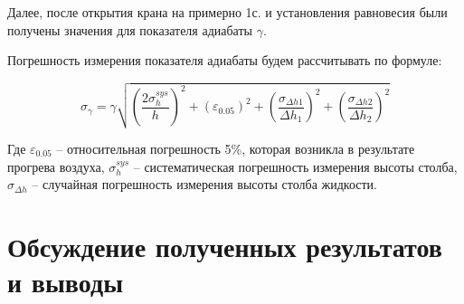 \documentclass[a4paper,12pt]{article}
\begin{document}
    Далее, после открытия крана на примерно 1с. и установления равновесия были получены значения для показателя адиабаты $\gamma$.

    \begin{figure}
        
        
    \end{figure}

    Погрешность измерения показателя адиабаты будем рассчитывать по формуле:

    \begin{equation}
        \sigma_\gamma=\gamma\sqrt{\left(
            \frac{2\sigma_h^{sys}}{h}\right)^2+\left(\varepsilon_{0.05}\right)^2+\left(\frac{\sigma_{\Delta h1}}{\Delta h_1}\right)^2+\left(\frac{\sigma_{\Delta {h2}}}{\Delta h_2}\right)^2}
    \end{equation}

    Где $\varepsilon_{0.05}$ -- относительная погрешность 5\%, которая возникла в результате прогрева воздуха, $\sigma_h^{sys}$ -- систематическая погрешность измерения высоты столба, $\sigma_{\Delta h}$ -- случайная погрешность измерения высоты столба жидкости.



    \section*{Обсуждение полученных результатов и выводы}
    

    
\end{document}
